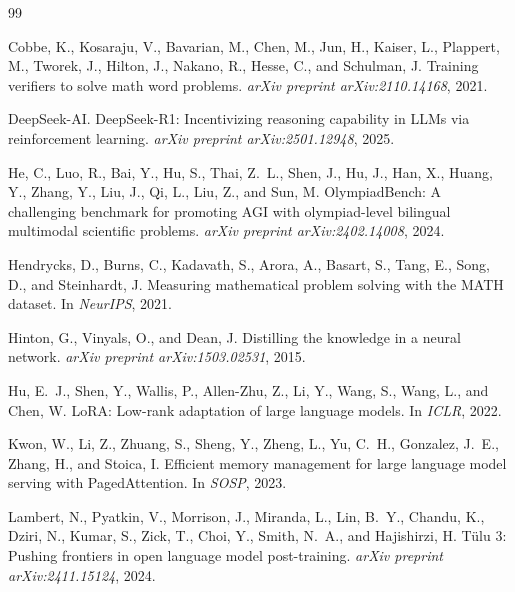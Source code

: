 \documentclass[11pt,a4paper]{article}
\begin{document}
\begin{thebibliography}{99}

Cobbe, K., Kosaraju, V., Bavarian, M., Chen, M., Jun, H., Kaiser, L., Plappert, M., Tworek, J., Hilton, J., Nakano, R., Hesse, C., and Schulman, J.
\newblock Training verifiers to solve math word problems.
\newblock \emph{arXiv preprint arXiv:2110.14168}, 2021.

DeepSeek-AI.
\newblock DeepSeek-R1: Incentivizing reasoning capability in LLMs via reinforcement learning.
\newblock \emph{arXiv preprint arXiv:2501.12948}, 2025.

He, C., Luo, R., Bai, Y., Hu, S., Thai, Z.~L., Shen, J., Hu, J., Han, X., Huang, Y., Zhang, Y., Liu, J., Qi, L., Liu, Z., and Sun, M.
\newblock OlympiadBench: A challenging benchmark for promoting AGI with olympiad-level bilingual multimodal scientific problems.
\newblock \emph{arXiv preprint arXiv:2402.14008}, 2024.

Hendrycks, D., Burns, C., Kadavath, S., Arora, A., Basart, S., Tang, E., Song, D., and Steinhardt, J.
\newblock Measuring mathematical problem solving with the MATH dataset.
\newblock In \emph{NeurIPS}, 2021.

Hinton, G., Vinyals, O., and Dean, J.
\newblock Distilling the knowledge in a neural network.
\newblock \emph{arXiv preprint arXiv:1503.02531}, 2015.

Hu, E.~J., Shen, Y., Wallis, P., Allen-Zhu, Z., Li, Y., Wang, S., Wang, L., and Chen, W.
\newblock LoRA: Low-rank adaptation of large language models.
\newblock In \emph{ICLR}, 2022.

Kwon, W., Li, Z., Zhuang, S., Sheng, Y., Zheng, L., Yu, C.~H., Gonzalez, J.~E., Zhang, H., and Stoica, I.
\newblock Efficient memory management for large language model serving with {P}aged{A}ttention.
\newblock In \emph{SOSP}, 2023.

Lambert, N., Pyatkin, V., Morrison, J., Miranda, L., Lin, B.~Y., Chandu, K., Dziri, N., Kumar, S., Zick, T., Choi, Y., Smith, N.~A., and Hajishirzi, H.
\newblock T\"ulu 3: Pushing frontiers in open language model post-training.
\newblock \emph{arXiv preprint arXiv:2411.15124}, 2024.


\end{thebibliography}
\end{document}
